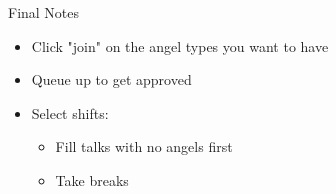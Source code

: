 
\begin{frame}{Final Notes}
	\begin{itemize}
		\item Click "join" on the angel types you want to have
		\item Queue up to get approved
		\item Select shifts:
		\begin{itemize}
			\item Fill talks with no angels first
			\item Take breaks
		\end{itemize}
	\end{itemize}
\end{frame}
